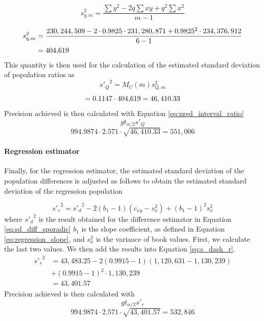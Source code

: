 \begin{equation}
	s_{q, m}^2 = \frac{\sum{y^2} - 2q\sum{xy} + q^2\sum{x^2}}{m - 1}
	\label{eq:sd_ratios_m}
\end{equation}

\begin{align*}
	s_{q, m}^2 &= \frac{230,244,509 - 2 \cdot 0.9825 \cdot 231,280,871 + 0.9825^2 \cdot 234,376,912}{6 - 1} \\ 
	&= \AuxSporadicRatioVariance
\end{align*}
This quantity is then used for the calculation of the estimated standard deviation of population ratios as
\begin{equation}
	{s'_Q}^2 = M_U(m) s_{Q, m}^2
\end{equation}
\begin{equation*}
	= 0.1147 \cdot \AuxSporadicRatioVariance = 46,410.33
\end{equation*}
Precision achieved is then calculated with Equation \ref{eq:pred_interval_ratio}
\begin{equation*}
  g t_{\alpha/2} s'_Q
\end{equation*}
\begin{equation*}
  994.9874 \cdot 2.571 \cdot \sqrt{46,410.33} = 551,006
\end{equation*}

\paragraph{Regression estimator}

Finally, for the regression estimator, the estimated standard deviation of the population differences is adjusted as follows to obtain the estimated standard deviation of the regression population

\begin{equation}
	{s'_{r}}^2 = {s'_{d}}^2 - 2(b_1 - 1)(c_{xy} - s_x^2) + (b_1 - 1)^2 s_x^2
	\label{eq:s_dash_r}
\end{equation}
where ${s'_{d}}^2$ is the result obtained for the difference estimator in Equation \ref{eq:sd_diff_sporadic} $b_1$ is the slope coefficient, as defined in Equation \ref{eq:regression_slope}, and $s_x^2$ is the variance of book values. First, we calculate the last two values.
We then add the results into Equation \ref{eq:s_dash_r}.
\begin{align*}
	{s'_{r}}^2 &= 43,483.25 - 2(0.9915 - 1)(1,120,631 - 1,130,239) \\
	&+ (0.9915 - 1)^2 \cdot 1,130,239 \\
	&= 43,401.57
\end{align*}
Precision achieved is then calculated with 
\begin{equation*}
  g t_{\alpha/2} s'_r
\end{equation*}
\begin{equation*}
  994.9874 \cdot 2.571 \cdot \sqrt{43,401.57} = 532,846
\end{equation*}

